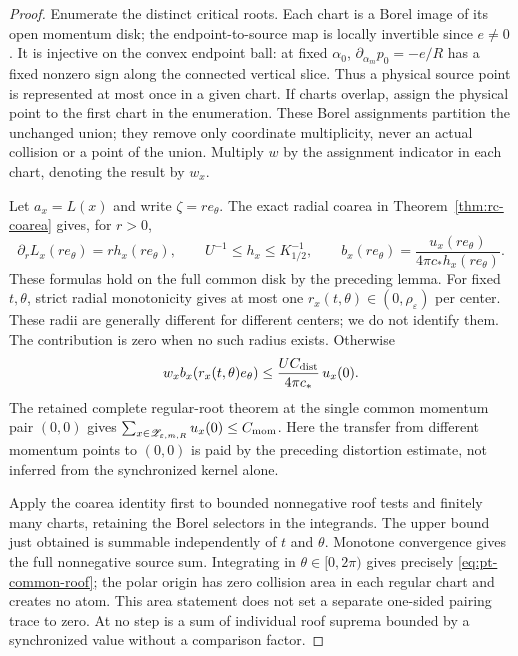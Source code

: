 \begin{proof}
Enumerate the distinct critical roots.  Each chart is a Borel image
of its open momentum disk; the endpoint-to-source map is locally
invertible since $e\ne0$.  It is injective on the convex endpoint
ball: at fixed $\alpha_0$, $\partial_{\alpha_m}p_0=-e/R$ has a
fixed nonzero sign along the connected vertical slice.  Thus a
physical source point is represented at most once in a given chart.
If charts overlap, assign the physical point to the first chart in
the enumeration.  These Borel assignments partition the unchanged
union; they remove only coordinate multiplicity, never an actual
collision or a point of the union.  Multiply $w$ by the assignment
indicator in each chart, denoting the result by $w_x$.

Let $a_x=L(x)$ and write $\zeta=r e_\theta$.  The exact radial
coarea in Theorem~\ref{thm:rc-coarea} gives, for $r>0$,
\[
 \partial_r L_x(re_\theta)=r h_x(re_\theta),\qquad
 U^{-1}\le h_x\le K_{1/2}^{-1},\qquad
 b_x(re_\theta)=\frac{u_x(re_\theta)}{4\pi c_*h_x(re_\theta)}.
\]
These formulas hold on the full common disk by the preceding lemma.
For fixed $t,\theta$, strict radial monotonicity gives at most one
$r_x(t,\theta)\in(0,\rho_\varepsilon)$ per center.  These radii
are generally different for different centers; we do not identify them.
The contribution is zero when no such radius exists.  Otherwise
\[
 w_x b_x(r_x(t,\theta)e_\theta)
       \le \frac{U C_{\rm dist}}{4\pi c_*}\,u_x(0).
\]
The retained complete regular-root theorem at the single common
momentum pair $(0,0)$ gives
$\sum_{x\in\mathscr Z_{\varepsilon,m,R}}u_x(0)\le C_{\rm mom}$.
Here the transfer from different momentum points to $(0,0)$ is paid
by the preceding distortion estimate, not inferred from the
synchronized kernel alone.

Apply the coarea identity first to bounded nonnegative roof tests
and finitely many charts, retaining the Borel selectors in the
integrands.  The upper bound just obtained is summable independently
of $t$ and $\theta$.  Monotone convergence gives the full nonnegative
source sum.  Integrating in $\theta\in[0,2\pi)$ gives precisely
\eqref{eq:pt-common-roof}; the polar origin has zero collision area
in each regular chart and creates no atom.  This area statement does
not set a separate one-sided pairing trace to zero.  At no step is a
sum of individual roof suprema bounded by a synchronized value without
a comparison factor.
\end{proof}

